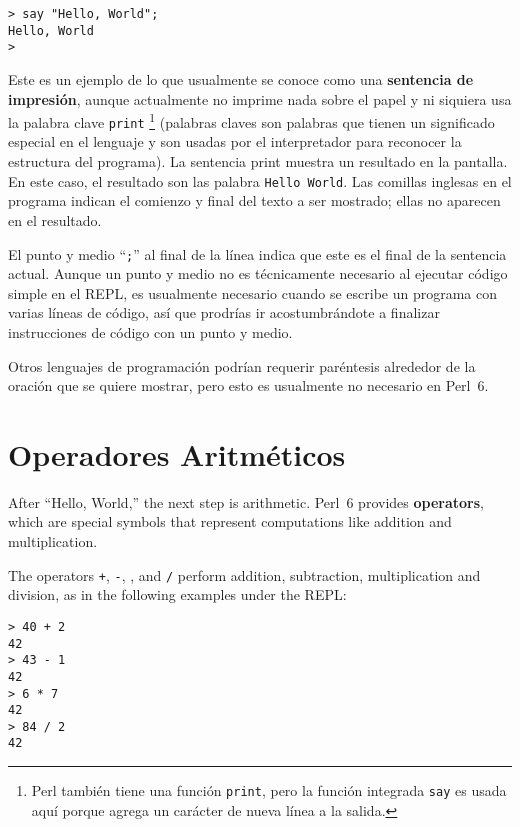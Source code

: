 \begin{verbatim}
> say "Hello, World";
Hello, World
>
\end{verbatim}
%
Este es un ejemplo de lo que usualmente se conoce como una {\bf sentencia de impresión},
aunque actualmente no imprime nada sobre el papel y ni siquiera usa la palabra clave
{\tt print} 
\footnote{Perl también tiene una función {\tt print},
pero la función integrada {\tt say} es usada aquí 
porque agrega un carácter de nueva línea a la salida.}
(palabras claves son palabras que tienen un significado especial
en el lenguaje y son usadas por el interpretador para reconocer la
estructura del programa).
La sentencia print muestra un resultado en la pantalla. En este caso, 
el resultado son las palabra {\tt Hello World}.
%
Las comillas inglesas en el programa indican el comienzo y final
del texto a ser mostrado; ellas no aparecen en el resultado.

El punto y medio ``{\tt ;}'' al final de la línea indica
que este es el final de la sentencia actual. Aunque un punto y medio
no es técnicamente necesario al ejecutar código simple en el REPL, 
es usualmente necesario cuando se escribe un programa con varias líneas
de código, así que prodrías ir acostumbrándote a finalizar instrucciones
de código con un punto y medio.   

Otros lenguajes de programación podrían requerir paréntesis
alrededor de la oración que se quiere mostrar, pero esto es usualmente 
no necesario en Perl~6.

\section{Operadores Aritméticos}

After ``Hello, World,'' the next step is arithmetic.  Perl~6 provides
{\bf operators}, which are special symbols that represent computations
like addition and multiplication.  

The operators {\tt +}, {\tt -}, {\tt *}, and {\tt /} perform addition,
subtraction, multiplication and division, as in the following examples
under the REPL:

\begin{verbatim}
> 40 + 2
42
> 43 - 1
42
> 6 * 7
42
> 84 / 2
42
\end{verbatim}
%

